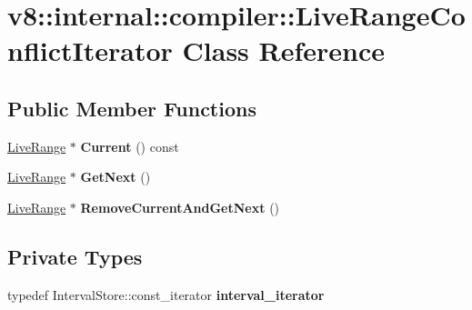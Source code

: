 \hypertarget{classv8_1_1internal_1_1compiler_1_1_live_range_conflict_iterator}{}\section{v8\+:\+:internal\+:\+:compiler\+:\+:Live\+Range\+Conflict\+Iterator Class Reference}
\label{classv8_1_1internal_1_1compiler_1_1_live_range_conflict_iterator}
\subsection*{Public Member Functions}
\begin{DoxyCompactItemize}
\item 
\hyperlink{classv8_1_1internal_1_1compiler_1_1_live_range}{Live\+Range} $\ast$ {\bfseries Current} () const \hypertarget{classv8_1_1internal_1_1compiler_1_1_live_range_conflict_iterator_a9bb3d7eba35a855f74f696ee8a6b4c87}{}\label{classv8_1_1internal_1_1compiler_1_1_live_range_conflict_iterator_a9bb3d7eba35a855f74f696ee8a6b4c87}

\item 
\hyperlink{classv8_1_1internal_1_1compiler_1_1_live_range}{Live\+Range} $\ast$ {\bfseries Get\+Next} ()\hypertarget{classv8_1_1internal_1_1compiler_1_1_live_range_conflict_iterator_a915172fb4c454aceb0a4069833e2bffc}{}\label{classv8_1_1internal_1_1compiler_1_1_live_range_conflict_iterator_a915172fb4c454aceb0a4069833e2bffc}

\item 
\hyperlink{classv8_1_1internal_1_1compiler_1_1_live_range}{Live\+Range} $\ast$ {\bfseries Remove\+Current\+And\+Get\+Next} ()\hypertarget{classv8_1_1internal_1_1compiler_1_1_live_range_conflict_iterator_a253b522748fc13944b7eb373adb6d951}{}\label{classv8_1_1internal_1_1compiler_1_1_live_range_conflict_iterator_a253b522748fc13944b7eb373adb6d951}

\end{DoxyCompactItemize}
\subsection*{Private Types}
\begin{DoxyCompactItemize}
\item 
typedef Interval\+Store\+::const\+\_\+iterator {\bfseries interval\+\_\+iterator}\hypertarget{classv8_1_1internal_1_1compiler_1_1_live_range_conflict_iterator_a74fafd707b9d0e2537561b0d93634209}{}\label{classv8_1_1internal_1_1compiler_1_1_live_range_conflict_iterator_a74fafd707b9d0e2537561b0d93634209}

\end{DoxyCompactItemize}
